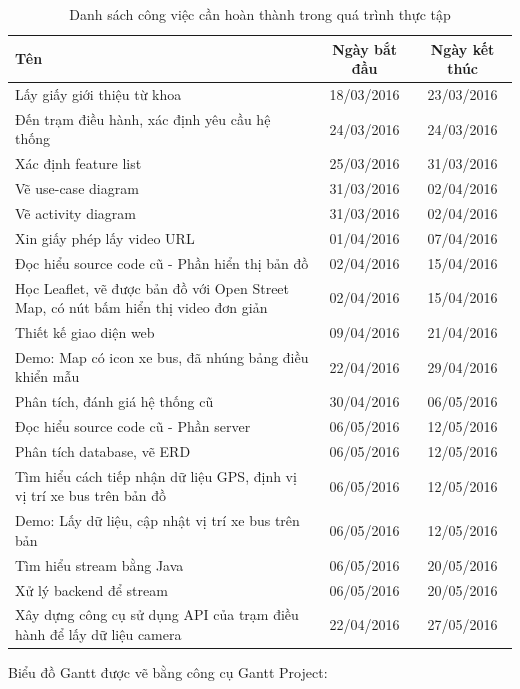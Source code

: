 \begin{table}[H]
	\centering
	\begin{tabular}{|m{8cm}|c|c|}
		\hline
		Tên & Ngày bắt đầu & Ngày kết thúc\\
		\hline
		Lấy giấy giới thiệu từ khoa&
		18/03/2016&
		23/03/2016\\\hline
		Đến trạm điều hành, xác định yêu cầu hệ thống&
		24/03/2016&
		24/03/2016\\\hline
		Xác định feature list&
		25/03/2016&
		31/03/2016\\\hline
		Vẽ use-case diagram&
		31/03/2016&
		02/04/2016\\\hline
		Vẽ activity diagram&
		31/03/2016&
		02/04/2016\\ \hline
		Xin giấy phép lấy video URL&
		01/04/2016&
		07/04/2016\\ \hline
		Đọc hiểu source code cũ - Phần hiển thị bản đồ&
		02/04/2016&
		15/04/2016\\ \hline
		Học Leaflet, vẽ được bản đồ với Open Street Map, có nút bấm hiển thị video đơn giản&
		02/04/2016&
		15/04/2016\\ \hline
		Thiết kế giao diện web&
		09/04/2016&
		21/04/2016\\ \hline
		Demo: Map có icon xe bus, đã nhúng bảng điều khiển mẫu&
		22/04/2016&
		29/04/2016\\ \hline
		Phân tích, đánh giá hệ thống cũ&
		30/04/2016&
		06/05/2016\\ \hline
		Đọc hiểu source code cũ - Phần server&
		06/05/2016&
		12/05/2016\\ \hline
		Phân tích database, vẽ ERD&
		06/05/2016&
		12/05/2016\\ \hline
		Tìm hiểu cách tiếp nhận dữ liệu GPS, định vị vị trí xe bus trên bản đồ&
		06/05/2016&
		12/05/2016\\ \hline
		Demo: Lấy dữ liệu, cập nhật vị trí xe bus trên bản&
		06/05/2016&
		12/05/2016\\ \hline
		Tìm hiểu stream bằng Java&
		06/05/2016&
		20/05/2016\\ \hline
		Xử lý backend để stream&
		06/05/2016&
		20/05/2016\\ \hline
		Xây dựng công cụ sử dụng API của trạm điều hành để lấy dữ liệu camera&
		22/04/2016&
		27/05/2016\\ \hline
	\end{tabular}
	\caption{Danh sách công việc cần hoàn thành trong quá trình thực tập}
\end{table}

Biểu đồ Gantt được vẽ bằng công cụ Gantt Project:

